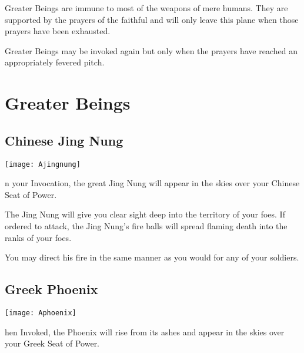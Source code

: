 Greater Beings are immune to most of the weapons of mere humans. They are supported by the prayers of the faithful and will only leave this plane when those prayers have been exhausted.

Greater Beings may be invoked again but only when the prayers have reached an appropriately fevered pitch.

\clearpage %

\section{Greater Beings}

\subsection{Chinese Jing Nung}


\begin{center}
    \texttt{[image: Ajingnung]}
\end{center}

n your Invocation, the great Jing Nung will appear in the skies over your Chinese Seat of Power.

The Jing Nung will give you clear sight deep into the territory of your foes. If ordered to attack, the Jing Nung’s fire balls will spread flaming death into the ranks of your foes.


You may direct his fire in the same manner as you would for any of your soldiers.

\subsection{Greek Phoenix}


\begin{center}
    \texttt{[image: Aphoenix]}
\end{center}


hen Invoked, the Phoenix will rise from its ashes and appear in the skies over your Greek Seat of Power.

